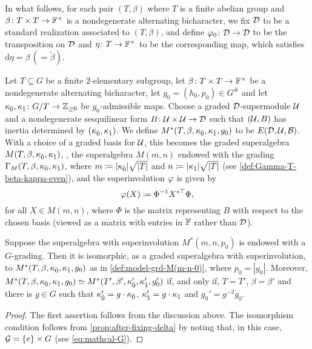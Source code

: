 In what follows, for each pair $(T, \beta)$ where $T$ is a finite abelian group and $\beta\colon {T\times T} \to \mathbb{F}^\times$ is a nondegenerate alternating bicharacter, we fix $\mathcal{D}$ to be a standard realization associated to $(T, \beta)$, and define $\varphi_0\colon \mathcal{D} \to \mathcal{D}$ to be the transposition on $\mathcal{D}$ and $\eta\colon T \to \mathbb{F}^\times$ to be the corresponding map, which satisfies $\mathrm{d}\eta = \beta \, (= \tilde\beta)$. 

\begin{defi}\label{def:model-grd-M(m-n-0)}
    Let $T \subseteq G$ be a finite $2$-elementary subgroup, let $\beta\colon {T\times T} \to \mathbb{F}^\times$ be a nondegenerate alternating bicharacter, let $g_0 = (h_0, p_0) \in G^\#$ and let $\kappa_{\bar{0}}, \kappa_{\bar{1}} \colon G/T \to \mathbb{Z}_{\geq 0}$ be $g_0$-admissible maps. 
    Choose a graded $\mathcal{D}$-supermodule $\mathcal U$ and a nondegenerate sesquilinear form $B\colon \mathcal U\times \mathcal U \to \mathcal{D}$ such that $(\mathcal U, B)$ has inertia determined by $(\kappa_{\bar{0}}, \kappa_{\bar{1}})$. 
    We define $M^*(T, \beta, \kappa_{\bar{0}}, \kappa_{\bar{1}}, g_0)$ to be $E(\mathcal{D}, \mathcal U, \mathcal B)$. 
    With a choice of a graded basis for $\mathcal U$, this becomes
    the graded superalgebra $M (T, \beta, \kappa_{\bar{0}}, \kappa_{\bar{1}})$, \ie, the superalgebra $M(m,n)$ endowed with the grading $\Gamma_M(T,\beta,\kappa_{\bar{0}},\kappa_{\bar{1}})$, where $m \coloneqq |\kappa_{\bar{0}}|\sqrt{|T|}$ and $n \coloneqq |\kappa_{\bar{1}}|\sqrt{|T|}$ (see \cref{def:Gamma-T-beta-kappa-even}), and the superinvolution $\varphi$ is given by 
    \[
        \varphi(X) \coloneqq \Phi^{-1} X^{s\top} \Phi,
    \]
    for all $X \in M(m,n)$, where $\Phi$ is the matrix representing $B$ with respect to the chosen basis (viewed as a matrix with entries in $\mathbb{F}$ rather than $\mathcal{D}$). 
\end{defi}

\begin{thm}\label{thm:osp-and-p-associative}
    Suppose the superalgebra with superinvolution $M^*(m,n,p_0)$ is endowed with a $G$-grading. 
    Then it is isomorphic, as a graded superalgebra with superinvolution, to $M^*(T,\beta, \kappa_{\bar{0}}, \kappa_{\bar{1}}, g_0)$ as in \cref{def:model-grd-M(m-n-0)}, where $p_0 = |g_0|$. 
    Moreover, $M^*(T, \beta, \kappa_{\bar{0}}, \kappa_{\bar{1}}, g_0) \simeq M^*(T', \beta', \kappa_{\bar{0}}', \kappa_{\bar{1}}', g_0')$ if, and only if, $T =T'$, $\beta = \beta'$ and there is $g \in G$ such that $\kappa_{\bar{0}}' = g\cdot\kappa_{\bar{0}}$, $\kappa_{\bar{1}}' = g\cdot\kappa_{\bar{1}}$ and $g_0' = g^{-2}g_0$. 
\end{thm}

\begin{proof}
    The first assertion follows from the discussion above. 
    The isomorphism condition follows from \cref{prop:after-fixing-delta} by noting that, in this case, $\mathcal G = \{e\} \times G$ (see \cref{eq:mathcal-G}). 
\end{proof}